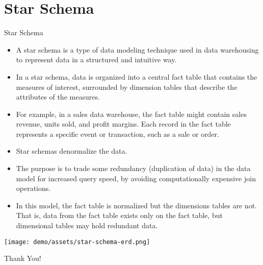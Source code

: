 \documentclass[12pt, aspectratio=169]{beamer}
\begin{document}
\section{Star Schema}
\begin{frame}[allowframebreaks] {Star Schema}
    \begin{itemize}
        \item A star schema is a type of data modeling technique used in data warehousing to represent data in a structured and intuitive way. 
        \item In a star schema, data is organized into a \alert{central fact table} that contains the measures of interest, surrounded by dimension tables that describe the attributes of the measures.
        \item For example, in a sales data warehouse, the fact table might contain sales revenue, units sold, and profit margins. Each record in the fact table represents a specific event or transaction, such as a sale or order.
    \end{itemize}
    \framebreak
    \begin{itemize}
        \item Star schemas \alert{denormalize} the data. \item The purpose is to trade some redundancy (duplication of data) in the data model for increased query speed, by avoiding computationally expensive join operations.
        \item In this model, the fact table is normalized but the dimensions tables are not. That is, data from the fact table exists only on the fact table, but dimensional tables may hold redundant data.
    \end{itemize}
    \framebreak
    \begin{center}
        \texttt{[image: demo/assets/star-schema-erd.png]}
    \end{center}
\end{frame}

\begin{frame}[standout]
Thank You!
\end{frame}
\end{document}

